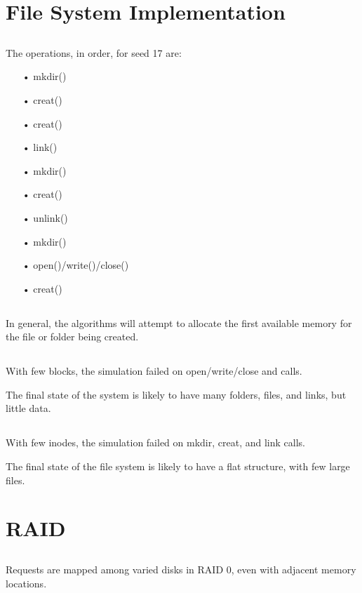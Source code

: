 \documentclass[]{scrartcl}
\begin{document}
\section{File System Implementation}
\subsection{}
The operations, in order, for seed 17 are:
\begin{itemize}
\item[•] mkdir()
\item[•] creat()
\item[•] creat()
\item[•] link()
\item[•] mkdir()
\item[•] creat()
\item[•] unlink()
\item[•] mkdir()
\item[•] open()/write()/close()
\item[•] creat()
\end{itemize}
\subsection{}
In general, the algorithms will attempt to allocate the first available memory for the file or folder being created.

\subsection{}
With few blocks, the simulation failed on open/write/close and calls.

The final state of the system is likely to have many folders, files, and links, but little data.

\subsection{}
With few inodes, the simulation failed on mkdir, creat, and link calls.

The final state of the file system is likely to have a flat structure, with few large files.

\section{RAID}
\subsection{}
Requests are mapped among varied disks in RAID 0, even with adjacent memory locations.
\end{document}
